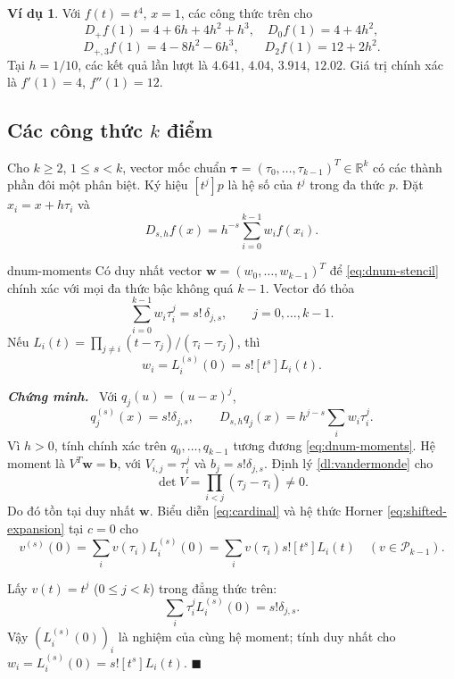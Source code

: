 \documentclass[12pt,a4paper,oneside]{book}
\numberwithin{algorithm}{chapter}
\theoremstyle{definition}
\newtheorem{vidu}{Ví dụ}[chapter]
\newenvironment{chungminh}{\par\medskip\noindent\textbf{\textit{\color{mainblue}Chứng minh.}}\ }{\hfill$\blacksquare$\par\medskip}
\newcommand{\R}{\mathbb{R}}
\begin{document}
\begin{vidu}
Với $f(t)=t^4$, $x=1$, các công thức trên cho
\[
 D_+f(1)=4+6h+4h^2+h^3,\quad D_0f(1)=4+4h^2,
\]
\[
 D_{+,3}f(1)=4-8h^2-6h^3,\qquad D_2f(1)=12+2h^2.
\]
Tại $h=1/10$, các kết quả lần lượt là $4.641$, $4.04$, $3.914$, $12.02$. Giá trị chính xác là $f'(1)=4$, $f''(1)=12$.
\end{vidu}

\subsection{Các công thức \texorpdfstring{$k$}{k} điểm}
Cho $k\geq2$, $1\leq s<k$, vector mốc chuẩn $\boldsymbol\tau=(\tau_0,\ldots,\tau_{k-1})^T\in\R^k$ có các thành phần đôi một phân biệt. Ký hiệu $[t^j]p$ là hệ số của $t^j$ trong đa thức $p$. Đặt $x_i=x+h\tau_i$ và
\begin{equation}\label{eq:dnum-stencil}
 D_{s,h}f(x)=h^{-s}\sum_{i=0}^{k-1}w_if(x_i).
\end{equation}

\begin{dinhly}{}{dnum-moments}
Có duy nhất vector $\boldsymbol w=(w_0,\ldots,w_{k-1})^T$ để \eqref{eq:dnum-stencil} chính xác với mọi đa thức bậc không quá $k-1$. Vector đó thỏa
\begin{equation}\label{eq:dnum-moments}
 \sum_{i=0}^{k-1}w_i\tau_i^j=s!\,\delta_{j,s},\qquad j=0,\ldots,k-1.
\end{equation}
Nếu $L_i(t)=\prod_{j\ne i}(t-\tau_j)/(\tau_i-\tau_j)$, thì
\[
 w_i=L_i^{(s)}(0)=s![t^s]L_i(t).
\]
\end{dinhly}
\begin{chungminh}
Với $q_j(u)=(u-x)^j$,
\[
 q_j^{(s)}(x)=s!\delta_{j,s},\qquad
 D_{s,h}q_j(x)=h^{j-s}\sum_iw_i\tau_i^j.
\]
Vì $h>0$, tính chính xác trên $q_0,\ldots,q_{k-1}$ tương đương \eqref{eq:dnum-moments}. Hệ moment là $V^T\boldsymbol w=\boldsymbol b$, với $V_{i,j}=\tau_i^j$ và $b_j=s!\delta_{j,s}$. Định lý \ref{dl:vandermonde} cho
\[
 \det V=\prod_{i<j}(\tau_j-\tau_i)\ne0.
\]
Do đó tồn tại duy nhất $\boldsymbol w$. Biểu diễn \eqref{eq:cardinal} và hệ thức Horner \eqref{eq:shifted-expansion} tại $c=0$ cho
\[
 v^{(s)}(0)=\sum_i v(\tau_i)L_i^{(s)}(0)
 =\sum_i v(\tau_i)s![t^s]L_i(t)\quad(v\in\mathcal P_{k-1}).
\]

Lấy $v(t)=t^j$ ($0\leq j<k$) trong đẳng thức trên:
\[
 \sum_i\tau_i^jL_i^{(s)}(0)=s!\delta_{j,s}.
\]
Vậy $(L_i^{(s)}(0))_i$ là nghiệm của cùng hệ moment; tính duy nhất cho $w_i=L_i^{(s)}(0)=s![t^s]L_i(t)$.
\end{chungminh}
\end{document}
